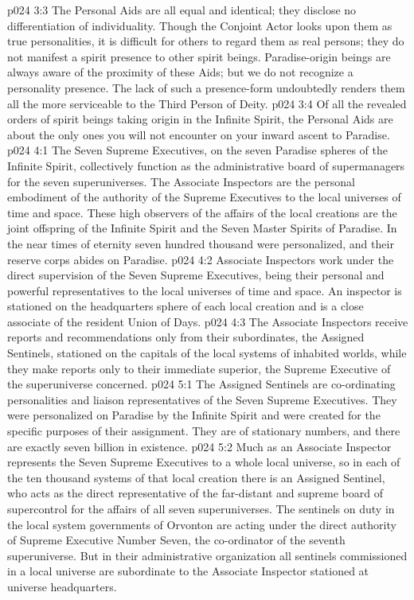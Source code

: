 \vs p024 3:3 The Personal Aids are all equal and identical; they disclose no differentiation of individuality. Though the Conjoint Actor looks upon them as true personalities, it is difficult for others to regard them as real persons; they do not manifest a spirit presence to other spirit beings. Paradise\hyp{}origin beings are always aware of the proximity of these Aids; but we do not recognize a personality presence. The lack of such a presence\hyp{}form undoubtedly renders them all the more serviceable to the Third Person of Deity.
\vs p024 3:4 Of all the revealed orders of spirit beings taking origin in the Infinite Spirit, the Personal Aids are about the only ones you will not encounter on your inward ascent to Paradise.
\vs p024 4:1 The Seven Supreme Executives, on the seven Paradise spheres of the Infinite Spirit, collectively function as the administrative board of supermanagers for the seven superuniverses. The Associate Inspectors are the personal embodiment of the authority of the Supreme Executives to the local universes of time and space. These high observers of the affairs of the local creations are the joint offspring of the Infinite Spirit and the Seven Master Spirits of Paradise. In the near times of eternity seven hundred thousand were personalized, and their reserve corps abides on Paradise.\plusone
\vs p024 4:2 Associate Inspectors work under the direct supervision of the Seven Supreme Executives, being their personal and powerful representatives to the local universes of time and space. An inspector is stationed on the headquarters sphere of each local creation and is a close associate of the resident Union of Days.
\vs p024 4:3 The Associate Inspectors receive reports and recommendations only from their subordinates, the Assigned Sentinels, stationed on the capitals of the local systems of inhabited worlds, while they make reports only to their immediate superior, the Supreme Executive of the superuniverse concerned.
\vs p024 5:1 The Assigned Sentinels are co\hyp{}ordinating personalities and liaison representatives of the Seven Supreme Executives. They were personalized on Paradise by the Infinite Spirit and were created for the specific purposes of their assignment. They are of stationary numbers, and there are exactly seven billion in existence.
\vs p024 5:2 Much as an Associate Inspector represents the Seven Supreme Executives to a whole local universe, so in each of the ten thousand systems of that local creation there is an Assigned Sentinel, who acts as the direct representative of the far\hyp{}distant and supreme board of supercontrol for the affairs of all seven superuniverses. The sentinels on duty in the local system governments of Orvonton are acting under the direct authority of Supreme Executive Number Seven, the co\hyp{}ordinator of the seventh superuniverse. But in their administrative organization all sentinels commissioned in a local universe are subordinate to the Associate Inspector stationed at universe headquarters.
